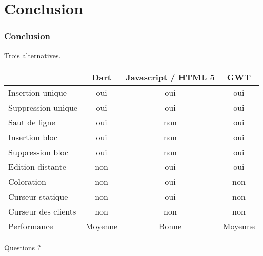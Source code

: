 \section{Conclusion}
  \begin{frame}
    \frametitle{Conclusion}
    Trois alternatives.
    \begin{scriptsize}
      \begin{table}[h!]
        \center
        \begin{tabular}{|l|c|c|c|} 
        \hline
         ~ & Dart & Javascript / HTML 5 & GWT\\
        \hline
        Insertion unique & oui & oui &oui\\
        \hline
        Suppression unique & oui & oui & oui\\
        \hline
        Saut de ligne & oui & non & oui\\
        \hline
        Insertion bloc & oui & non & oui\\
        \hline
        Suppression bloc & oui & non & oui\\
        \hline
        Edition distante & non & oui & oui \\
        \hline
        Coloration & non & oui & non \\
        \hline
        Curseur statique & non & oui & non \\ 
        \hline
        Curseur des clients & non & non & non \\
        \hline
        Performance & Moyenne & Bonne & Moyenne \\ 
        \hline
        \end{tabular}
      \end{table}
    \end{scriptsize}
  \end{frame}

  \begin{frame}
    Questions ?
  \end{frame}

